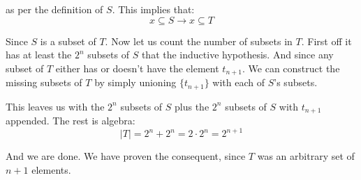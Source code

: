\documentclass{article}
\begin{document}
as per the definition of $S$. This implies that:
$$x\subseteq S\rightarrow x\subseteq T$$

Since $S$ is a subset of $T$. Now let us count the number of subsets in $T$. First off it has at least the $2^n$ subsets of $S$ that the inductive hypothesis. And since any subset of $T$ either has or doesn't have the element $t_{n+1}$. We can construct the missing subsets of $T$ by simply unioning $\{t_{n+1}\}$ with each of $S$'s subsets.

This leaves us with the $2^n$ subsets of $S$ plus the $2^n$ subsets of $S$ with $t_{n+1}$ appended. The rest is algebra:
$$|T|=2^n+2^n=2\cdot2^n=2^{n+1}$$

And we are done. We have proven the consequent, since $T$ was an arbitrary set of $n+1$ elements.
\end{document}
